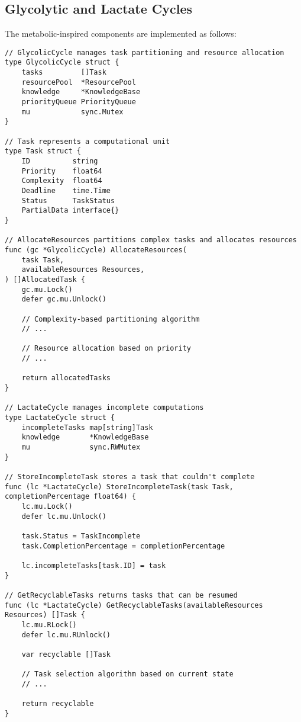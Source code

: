 \documentclass[11pt,a4paper,twocolumn]{article}
\begin{document}
\subsection{Glycolytic and Lactate Cycles}
The metabolic-inspired components are implemented as follows:

\begin{lstlisting}[caption={Metabolic Component Implementation}, label={lst:metabolic}]
// GlycolicCycle manages task partitioning and resource allocation
type GlycolicCycle struct {
    tasks         []Task
    resourcePool  *ResourcePool
    knowledge     *KnowledgeBase
    priorityQueue PriorityQueue
    mu            sync.Mutex
}

// Task represents a computational unit
type Task struct {
    ID          string
    Priority    float64
    Complexity  float64
    Deadline    time.Time
    Status      TaskStatus
    PartialData interface{}
}

// AllocateResources partitions complex tasks and allocates resources
func (gc *GlycolicCycle) AllocateResources(
    task Task, 
    availableResources Resources,
) []AllocatedTask {
    gc.mu.Lock()
    defer gc.mu.Unlock()
    
    // Complexity-based partitioning algorithm
    // ...
    
    // Resource allocation based on priority
    // ...
    
    return allocatedTasks
}

// LactateCycle manages incomplete computations
type LactateCycle struct {
    incompleteTasks map[string]Task
    knowledge       *KnowledgeBase
    mu              sync.RWMutex
}

// StoreIncompleteTask stores a task that couldn't complete
func (lc *LactateCycle) StoreIncompleteTask(task Task, completionPercentage float64) {
    lc.mu.Lock()
    defer lc.mu.Unlock()
    
    task.Status = TaskIncomplete
    task.CompletionPercentage = completionPercentage
    
    lc.incompleteTasks[task.ID] = task
}

// GetRecyclableTasks returns tasks that can be resumed
func (lc *LactateCycle) GetRecyclableTasks(availableResources Resources) []Task {
    lc.mu.RLock()
    defer lc.mu.RUnlock()
    
    var recyclable []Task
    
    // Task selection algorithm based on current state
    // ...
    
    return recyclable
}
\end{lstlisting}
\end{document}

